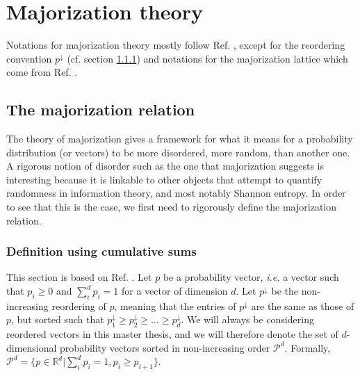 \chapter{Majorization theory} \label{chap:majorization}

Notations for majorization theory mostly follow Ref. \cite{marshall_inequalities_2011}, except for the reordering convention $p^\downarrow$ (cf. section \ref{sec:cumulative}) and notations for the majorization lattice which come from Ref. \cite{cicalese_supermodularity_2002}.



\section{The majorization relation} \label{sec:majorization}

The theory of majorization gives a framework for what it means for a probability distribution (or vectors) to be more disordered, more random, than another one. A rigorous notion of disorder such as the one that majorization suggests is interesting because it is linkable to other objects that attempt to quantify randomness in information theory, and most notably Shannon entropy. In order to see that this is the case, we first need to rigorously define the majorization relation.



\subsection{Definition using cumulative sums} \label{sec:cumulative}

This section is based on Ref. \cite[pp. 4--10]{marshall_inequalities_2011}. Let $p$ be a probability vector, \textit{i.e.} a vector such that $p_i \geq 0$ and $\sum_{i}^{d} p_i = 1$ for a vector of dimension $d$. Let $p^\downarrow$ be the non-increasing reordering of $p$, meaning that the entries of $p^\downarrow$ are the same as those of $p$, but sorted such that $p^\downarrow_1 \geq p^\downarrow_2 \geq ... \geq p^\downarrow_d$. We will always be considering reordered vectors in this master thesis, and we will therefore denote the set of $d$-dimensional probability vectors sorted in non-increasing order $\mathcal{P}^d$. Formally, $\mathcal{P}^d = \{p \in \mathbb{R}^d | \sum_{i}^{d} p_i = 1, p_i \geq p_{i+1}\}$.


